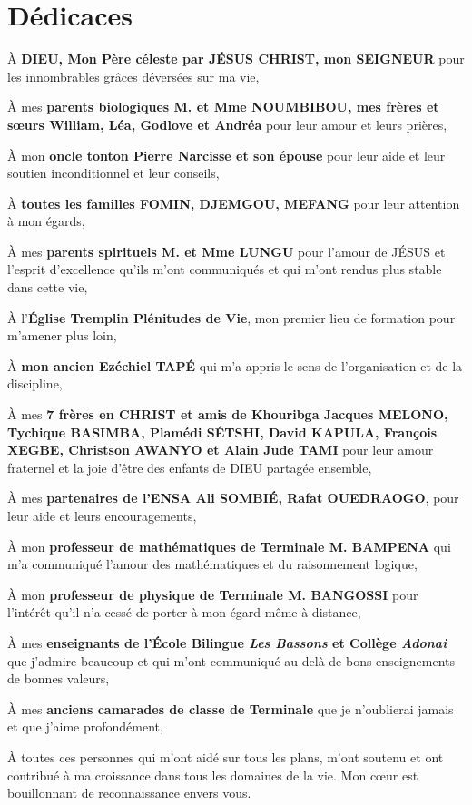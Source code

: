 \chapter*{Dédicaces}
À  \textbf{DIEU, Mon Père céleste par JÉSUS CHRIST, mon SEIGNEUR} pour les innombrables grâces déversées sur ma vie,


À  mes \textbf{parents biologiques M. et Mme NOUMBIBOU, mes frères et sœurs William, Léa, Godlove et Andréa} pour leur amour et leurs prières,


À  mon \textbf{oncle tonton Pierre Narcisse et son épouse} pour leur aide et leur soutien inconditionnel et leur conseils,


À  \textbf{toutes les familles FOMIN, DJEMGOU, MEFANG} pour leur attention à mon égards,


À  mes \textbf{parents spirituels M. et Mme LUNGU} pour l'amour de JÉSUS et l'esprit d'excellence qu'ils m'ont communiqués et  qui m'ont rendus plus stable dans cette vie,


À  l’\textbf{Église Tremplin Plénitudes de Vie}, mon premier lieu de formation pour m'amener plus loin,  


À  \textbf{mon ancien Ezéchiel TAPÉ} qui m'a appris le sens de l'organisation et de la discipline, 


À  mes \textbf{7 frères en CHRIST et amis de Khouribga Jacques MELONO, Tychique BASIMBA, Plamédi SÉTSHI, David KAPULA, François XEGBE, Christson AWANYO et Alain Jude TAMI} pour leur amour fraternel et la joie d’être des enfants de DIEU partagée ensemble,

À  mes \textbf{partenaires de l'ENSA Ali SOMBIÉ, Rafat OUEDRAOGO}, pour leur aide et leurs encouragements,

À  mon \textbf{professeur de mathématiques de Terminale M. BAMPENA} qui m'a communiqué l'amour des mathématiques et du raisonnement logique,


À  mon \textbf{professeur de physique de Terminale M. BANGOSSI} pour l'intérêt qu’il n’a cessé de porter à mon égard même à distance,

À  mes \textbf{enseignants de l'École Bilingue \textit{Les Bassons} et Collège \textit{Adonai}} que j'admire beaucoup et qui m'ont communiqué au delà de bons enseignements de bonnes valeurs, 

À  mes \textbf{anciens camarades de classe de Terminale} que je n'oublierai jamais et que j’aime profondément,

À  toutes ces personnes qui m'ont aidé sur tous les plans, m'ont soutenu  et ont contribué à ma croissance dans tous les domaines de la vie. Mon cœur est bouillonnant de reconnaissance envers vous.
